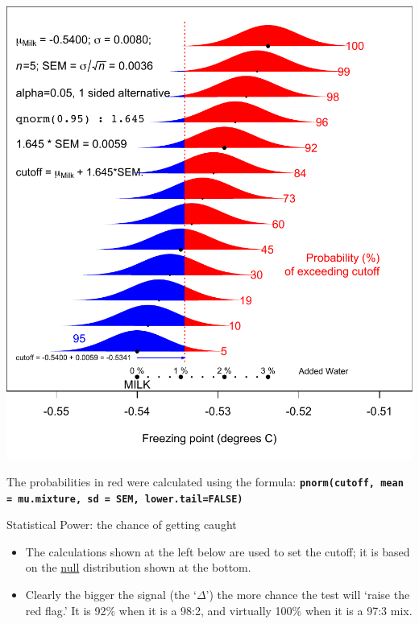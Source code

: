 \documentclass{beamer}\usepackage[]{graphicx}\usepackage[]{color}
\begin{document}
\begin{frame}

\begin{center}
	\includegraphics[scale=0.45]{ProbDetectingWaterInMilk.pdf} 
\end{center}

{ \footnotesize
	The probabilities in red were calculated using the formula:
	\texttt{\textbf{pnorm(cutoff, mean = mu.mixture, sd = SEM, lower.tail=FALSE)}} 
}
\end{frame}


\begin{frame}{Statistical Power: the chance of getting caught}
\begin{itemize}
		\setlength\itemsep{1em}
	\item The calculations shown at the left below are used to set  the cutoff;
it is based on the \underline{null} distribution shown at the bottom. 
\item Clearly the bigger the signal (the `$\Delta$') the more chance the test will `raise the red flag.' It is 92\% when it is a 98:2, and virtually 100\% when it is a 97:3 mix.
\end{itemize}


\end{frame}
\end{document}
